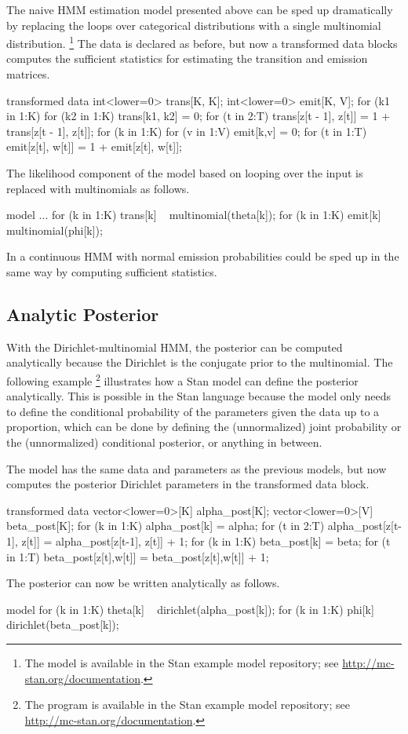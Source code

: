 The naive HMM estimation model presented above can be sped up
dramatically by replacing the loops over categorical distributions
with a single multinomial distribution.%
%
\footnote{The model is available in the Stan example model repository;
see \url{http://mc-stan.org/documentation}.}
%
The data is declared as before, but now a transformed data blocks
computes the sufficient statistics for estimating the transition and
emission matrices.
%
\begin{stancode}
transformed data {
  int<lower=0> trans[K, K];
  int<lower=0> emit[K, V];
  for (k1 in 1:K) 
    for (k2 in 1:K)
      trans[k1, k2] = 0;
  for (t in 2:T)
    trans[z[t - 1], z[t]] = 1 + trans[z[t - 1], z[t]];
  for (k in 1:K)
    for (v in 1:V)
      emit[k,v] = 0;
  for (t in 1:T)
    emit[z[t], w[t]] = 1 + emit[z[t], w[t]];
}
\end{stancode}
%
The likelihood component of the model based on looping over the input
is replaced with multinomials as follows.
%
\begin{stancode}
model {
  ...
  for (k in 1:K)
    trans[k] ~ multinomial(theta[k]);
  for (k in 1:K)
    emit[k] ~ multinomial(phi[k]);
}
\end{stancode}
%
In a continuous HMM with normal emission probabilities could be sped
up in the same way by computing sufficient statistics.

\subsection{Analytic Posterior}

With the Dirichlet-multinomial HMM, the posterior can be computed
analytically because the Dirichlet is the conjugate prior to the
multinomial.  The following example
%
\footnote{The program is available in the Stan example model repository;
see \url{http://mc-stan.org/documentation}.}
%
illustrates how a Stan model can define the posterior analytically.
This is possible in the Stan language because the model only needs to
define the conditional probability of the parameters given the data up
to a proportion, which can be done by defining the (unnormalized)
joint probability or the (unnormalized) conditional posterior, or
anything in between.

The model has the same data and parameters as the previous models, but
now computes the posterior Dirichlet parameters in the transformed
data block.
%
\begin{stancode}
transformed data {
  vector<lower=0>[K] alpha_post[K];
  vector<lower=0>[V] beta_post[K];
  for (k in 1:K) 
    alpha_post[k] = alpha;
  for (t in 2:T)
    alpha_post[z[t-1], z[t]] = alpha_post[z[t-1], z[t]] + 1;
  for (k in 1:K)
    beta_post[k] = beta;
  for (t in 1:T)
    beta_post[z[t],w[t]] = beta_post[z[t],w[t]] + 1;
}
\end{stancode}
%
The posterior can now be written analytically as follows.
%
\begin{stancode}
model {
  for (k in 1:K) 
    theta[k] ~ dirichlet(alpha_post[k]);
  for (k in 1:K)
    phi[k] ~ dirichlet(beta_post[k]);
}
\end{stancode}


